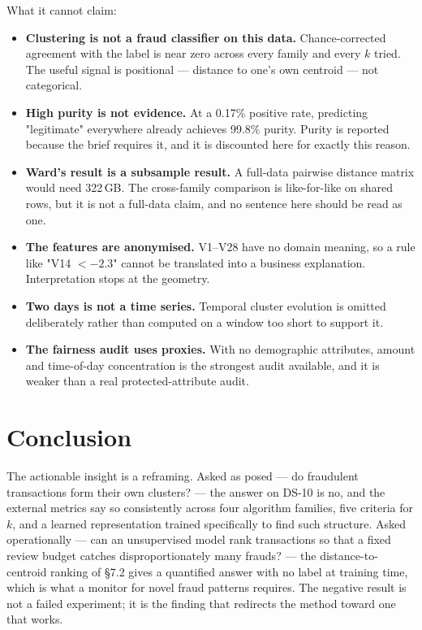 \documentclass[11pt, a4paper]{article}
\providecommand{\num}[1]{#1}
\begin{document}
What it cannot claim:

\begin{itemize}
  \item \textbf{Clustering is not a fraud classifier on this data.}
        Chance-corrected agreement with the label is near zero across every
        family and every $k$ tried. The useful signal is positional --- distance
        to one's own centroid --- not categorical.
  \item \textbf{High purity is not evidence.} At a \num{0.17}\% positive rate,
        predicting "legitimate" everywhere already achieves \num{99.8}\% purity.
        Purity is reported because the brief requires it, and it is discounted
        here for exactly this reason.
  \item \textbf{Ward's result is a subsample result.} A full-data pairwise
        distance matrix would need 322\,GB. The cross-family
        comparison is like-for-like on shared rows, but it is not a full-data
        claim, and no sentence here should be read as one.
  \item \textbf{The features are anonymised.} V1--V28 have no domain meaning, so
        a rule like "V14 $<-2.3$" cannot be translated into a business
        explanation. Interpretation stops at the geometry.
  \item \textbf{Two days is not a time series.} Temporal cluster evolution is
        omitted deliberately rather than computed on a window too short to
        support it.
  \item \textbf{The fairness audit uses proxies.} With no demographic
        attributes, amount and time-of-day concentration is the strongest audit
        available, and it is weaker than a real protected-attribute audit.
\end{itemize}

\section{Conclusion}

The actionable insight is a reframing. Asked as posed --- do fraudulent
transactions form their own clusters? --- the answer on DS-10 is no, and the
external metrics say so consistently across four algorithm families, five
criteria for $k$, and a learned representation trained specifically to find such
structure. Asked operationally --- can an unsupervised model rank transactions so
that a fixed review budget catches disproportionately many frauds? --- the
distance-to-centroid ranking of \S7.2 gives a quantified answer with no label at
training time, which is what a monitor for novel fraud patterns requires. The
negative result is not a failed experiment; it is the finding that redirects the
method toward one that works.
\end{document}
